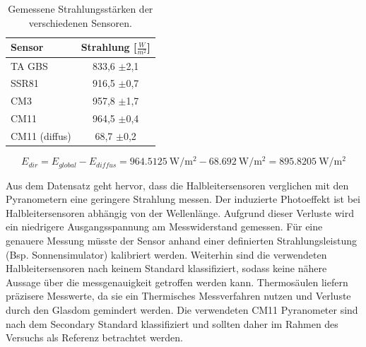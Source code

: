 \begin{table}[H]
	\centering
\begin{tabular}{l|c}
	\textbf{Sensor} & \textbf{Strahlung [$\frac{W}{m^2}$]}\\
	\hline
		TA GBS & 833,6 $\pm$2,1\\
		SSR81 & 916,5 $\pm$0,7\\
		CM3 & 957,8 $\pm$1,7\\
		CM11 & 964,5 $\pm$0,4\\
		CM11 (diffus) & 68,7 $\pm$0,2
\end{tabular} 

	\caption{Gemessene Strahlungsstärken der verschiedenen Sensoren.}
	\label{tab:radiation}
\end{table}


\begin{equation}
	\label{eq:Edir}
	E_{dir}=E_{global}-E_{diffus}=\SI{964.5125}{\watt\per\square\meter}-\SI{68.692}{\watt\per\square\meter} = \SI{895.8205}{\watt\per\square\meter}
\end{equation}

Aus dem Datensatz geht hervor, dass die Halbleitersensoren verglichen mit den Pyranometern eine geringere Strahlung messen. Der induzierte Photoeffekt ist bei Halbleitersensoren abhängig von der Wellenlänge. Aufgrund dieser Verluste wird ein niedrigere Ausgangsspannung am Messwiderstand gemessen. Für eine genauere Messung müsste der Sensor anhand einer definierten Strahlungsleistung (Bsp. Sonnensimulator) kalibriert werden. Weiterhin sind die verwendeten Halbleitersensoren nach keinem Standard klassifiziert, sodass keine nähere Aussage über die messgenauigkeit getroffen werden kann. Thermosäulen liefern präzisere Messwerte, da sie ein Thermisches Messverfahren nutzen und Verluste durch den Glasdom gemindert werden. Die verwendeten CM11 Pyranometer sind nach dem Secondary Standard klassifiziert und sollten daher im Rahmen des Versuchs als Referenz betrachtet werden.


